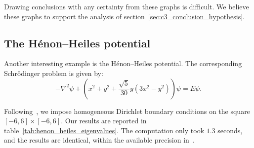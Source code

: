 Drawing conclusions with any certainty from these graphs is difficult. We believe these graphs to support the analysis of section~\ref{sec:c3_conclusion_hypothesis}.

\subsection{The H\texorpdfstring{é}{e}non--Heiles potential}\label{sec:c3_experiment_henon}

Another interesting example is the Hénon--Heiles potential. The corresponding Schrödinger problem is given by:
$$
  -\nabla^2 \psi + \left(x^2 + y^2 + \frac{\sqrt{5}}{30} y \left(3 x^2  - y^2\right)\right)\psi = E \psi \text{.}
$$

Following~\cite{braun_efficient_1996}, we impose homogeneous Dirichlet boundary conditions on the square $[-6, 6] \times [-6, 6]$. Our results are reported in table~\ref{tab:henon_heiles_eigenvalues}. The computation only took $1.3$ seconds, and the results are identical, within the available precision in~\cite{braun_efficient_1996}.

